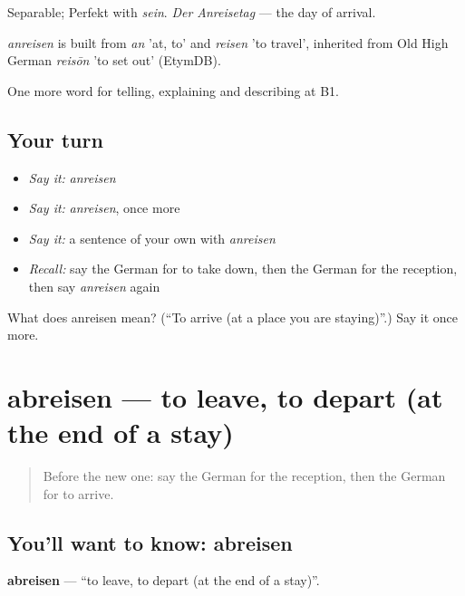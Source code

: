 Separable; Perfekt with \emph{sein}. \emph{Der Anreisetag} — the day of arrival.

\begin{cousinweb}
\emph{anreisen} is built from \emph{an} 'at, to' and \emph{reisen} 'to travel', inherited from Old High German \emph{reisōn} 'to set out' (EtymDB).
\end{cousinweb}

\begin{grammarlens}[title={What you've built}]
One more word for telling, explaining and describing at B1.
\end{grammarlens}

\subsection*{Your turn}
\begin{itemize}
\raggedright
  \item \emph{Say it:} \emph{anreisen}
  \item \emph{Say it:} \emph{anreisen}, once more
  \item \emph{Say it:} a sentence of your own with \emph{anreisen}
  \item \emph{Recall:} say the German for to take down, then the German for the reception, then say \emph{anreisen} again
\end{itemize}

\begin{tcolorbox}[breakable,colback=teal!4,colframe=teal!35!black,title={Before you move on}]
What does anreisen mean? (\textquotedblleft{}To arrive (at a place you are staying)\textquotedblright{}.) Say it once more.
\end{tcolorbox}
\section[abreisen]{abreisen — to leave, to depart (at the end of a stay)}

\label{lesson:GE-C426-abreisen}



\begin{quote}
Before the new one: say the German for the reception, then the German for to arrive.
\end{quote}

\subsection*{You'll want to know: abreisen}
\textbf{abreisen} — \textquotedblleft{}to leave, to depart (at the end of a stay)\textquotedblright{}.

